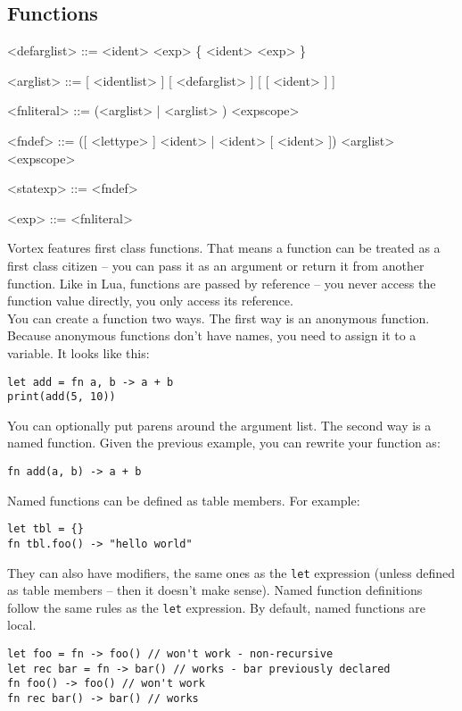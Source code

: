 \documentclass{article}
\newenvironment{bnf}
{
\begin{mdframed}
\begin{grammar}
}
{
\end{grammar}
\end{mdframed}
}
\begin{document}
\subsection{Functions}
\begin{bnf}
<defarglist> ::= <ident> \lit{=} <exp> \{ \lit{,} <ident> \lit{=} <exp> \}

<arglist> ::= [ <identlist> ] [ <defarglist> ] [ [ <ident> ]  ]

<fnliteral> ::=  (<arglist> | \lit{(} <arglist> \lit{)}) <expscope>

<fndef> ::=  ([ <lettype> ] <ident> | <ident> [  <ident> ])
    \lit{(} <arglist> \lit{)} <expscope>

<statexp> ::= <fndef>

<exp> ::= <fnliteral>
\end{bnf}
Vortex features first class functions. That means a function can be treated
as a first class citizen -- you can pass it as an argument or return it from
another function. Like in Lua, functions are passed by reference -- you never
access the function value directly, you only access its reference.\\
You can create a function two ways. The first way is an anonymous function.
Because anonymous functions don't have names, you need to assign it to a
variable. It looks like this:
\begin{lstlisting}[language=vortex]
let add = fn a, b -> a + b
print(add(5, 10))
\end{lstlisting}
You can optionally put parens around the argument list. The second way is
a named function. Given the previous example, you can rewrite your function
as:
\begin{lstlisting}[language=vortex]
fn add(a, b) -> a + b
\end{lstlisting}
Named functions can be defined as table members. For example:
\begin{lstlisting}[language=vortex]
let tbl = {}
fn tbl.foo() -> "hello world"
\end{lstlisting}
They can also have modifiers, the same ones as the \verb|let| expression
(unless defined as table members -- then it doesn't make sense). Named
function definitions follow the same rules as the \verb|let| expression.
By default, named functions are local.
\begin{lstlisting}[language=vortex]
let foo = fn -> foo() // won't work - non-recursive
let rec bar = fn -> bar() // works - bar previously declared
fn foo() -> foo() // won't work
fn rec bar() -> bar() // works
\end{lstlisting}
\end{document}
